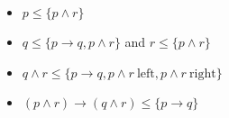 
\begin{itemize}
\item $p \leqslant \{p \land r\}$
\item $q \leqslant \{p \to q, p \land r\}$ and $r \leqslant \{p \land r\}$
\item $q \land r \leqslant \{ p \to q, p \land r \ \text{left}, p \land r \ \text{right} \}$
\item $(p \land r) \to (q \land r) \leq \{ p \to q \}$  
\end{itemize}
